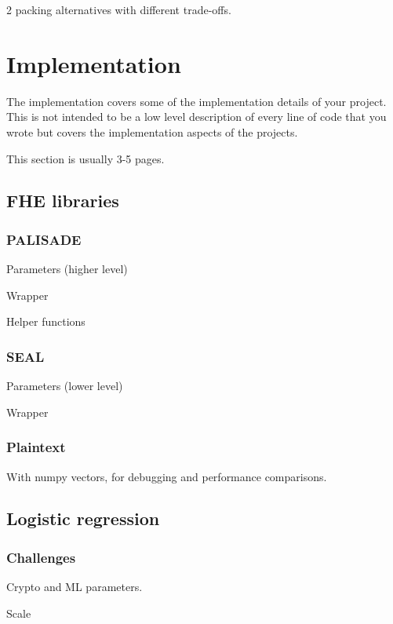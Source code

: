 \documentclass[a4paper,11pt,oneside]{report}
\begin{document}
2 packing alternatives with different trade-offs.



\chapter{Implementation}

The implementation covers some of the implementation details of your project.
This is not intended to be a low level description of every line of code that
you wrote but covers the implementation aspects of the projects.

This section is usually 3-5 pages.

\section{FHE libraries}

\subsection{PALISADE}

Parameters (higher level)

Wrapper

Helper functions

\subsection{SEAL}

Parameters (lower level)

Wrapper

\subsection{Plaintext}

With numpy vectors, for debugging and performance comparisons.

\section{Logistic regression}

\subsection{Challenges}
Crypto and ML parameters.

Scale
\end{document}
